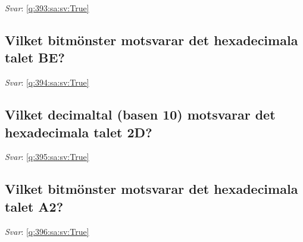 \documentclass[a4paper,11pt,oneside]{article}
\begin{document}
\begin{sloppypar}
\label{q:393:sa:sv:False}

\vspace{2cm}

\noindent\makebox[\textwidth]{\hrulefill}

\vspace{1cm}

\textit{Svar}: \autoref{q:393:sa:sv:True}



\subsection{Vilket bitm\"onster motsvarar det hexadecimala talet BE?}

\label{q:394:sa:sv:False}

\vspace{2cm}

\noindent\makebox[\textwidth]{\hrulefill}

\vspace{1cm}

\textit{Svar}: \autoref{q:394:sa:sv:True}



\subsection{Vilket decimaltal (basen 10) motsvarar det hexadecimala talet 2D?}

\label{q:395:sa:sv:False}

\vspace{2cm}

\noindent\makebox[\textwidth]{\hrulefill}

\vspace{1cm}

\textit{Svar}: \autoref{q:395:sa:sv:True}



\subsection{Vilket bitm\"onster motsvarar det hexadecimala talet A2?}

\label{q:396:sa:sv:False}

\vspace{2cm}

\noindent\makebox[\textwidth]{\hrulefill}

\vspace{1cm}

\textit{Svar}: \autoref{q:396:sa:sv:True}




\end{sloppypar}
\end{document}
